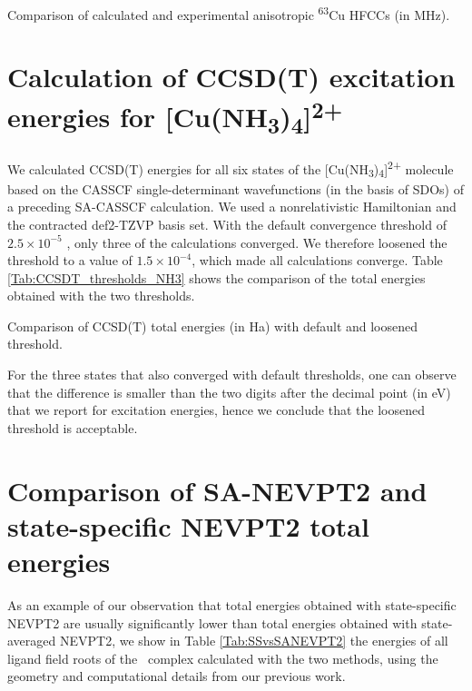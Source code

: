 \begin{table}
\small
\centering
\ttabbox
{\caption[Comparison of calculated and experimental anisotropic \textsuperscript{63}Cu HFCCs.]{Comparison of calculated and experimental anisotropic \textsuperscript{63}Cu HFCCs (in MHz).}
\label{Tab:A_aniso}}
{
}
\end{table}

\section{Calculation of CCSD(T) excitation energies for [Cu(NH\textsubscript{3})\textsubscript{4}]\textsuperscript{2+}}
\label{Sec:appendix_CCSDT_NH3}
We calculated CCSD(T) energies for all six states of the [Cu(NH\textsubscript{3})\textsubscript{4}]\textsuperscript{2+} molecule based on the CASSCF single-determinant wavefunctions (in the basis of SDOs) of a preceding SA-CASSCF calculation. We used a nonrelativistic Hamiltonian and the contracted def2-TZVP basis set. With the default convergence threshold of $2.5 \times {10^{ - 5}}$ , only three of the calculations converged. We therefore loosened the threshold to a value of $1.5 \times {10^{ - 4}}$, which made all calculations converge. Table \ref{Tab:CCSDT_thresholds_NH3} shows the comparison of the total energies obtained with the two thresholds.

\begin{table}
\small
\centering
\ttabbox
{\caption[Comparison of CCSD(T) total energies with default and loosened threshold.]{Comparison of CCSD(T) total energies (in Ha) with default and loosened threshold.}
\label{Tab:CCSDT_thresholds_NH3}}
{
}
\end{table}

For the three states that also converged with default thresholds, one can observe that the difference is smaller than the two digits after the decimal point (in eV) that we report for excitation energies, hence we conclude that the loosened threshold is acceptable.

\section{Comparison of SA-NEVPT2 and state-specific NEVPT2 total energies}
\label{Sec:appendix_SSvsSANEVPT2totalE}
As an example of our observation that total energies obtained with state-specific NEVPT2 are usually significantly lower than total energies obtained with state-averaged NEVPT2, we show in Table \ref{Tab:SSvsSANEVPT2} the energies of all ligand field roots of the \Cosacsac\ complex calculated with the two methods, using the geometry and computational details from our previous work.\cite{LangN_2019_104104}

